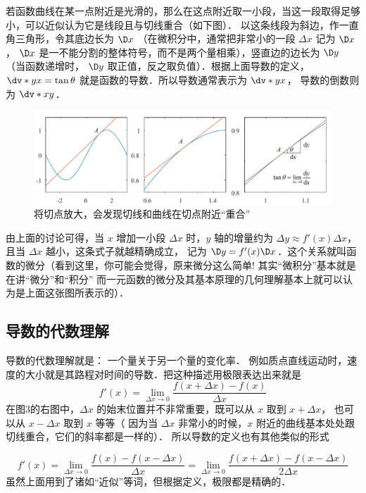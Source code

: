 若函数曲线在某一点附近是光滑的，那么在这点附近取一小段，当这一段取得足够小，可以近似认为它是线段且与切线重合（如下图）． 以这条线段为斜边，作一直角三角形，令其底边长为 $\D x$ （在微积分中，通常把非常小的一段 $\Delta x$ 记为 $\D x$，  $\D x$ 是一不能分割的整体符号，而不是两个量相乘），竖直边的边长为 $\D y$ （当函数递增时， $\D y$ 取正值，反之取负值）．根据上面导数的定义，$\dv*{y}{x} = \tan \theta $ 就是函数的导数．所以导数通常表示为 $\dv*{y}{x}$， 导数的倒数则为 $\dv*{x}{y}$． 

\begin{figure}[ht]
\centering
\includegraphics[width=14cm]{./figures/Der2.pdf}
\caption{将切点放大，会发现切线和曲线在切点附近“重合”}
\end{figure}

由上面的讨论可得，当 $x$ 增加一小段 $\Delta x$ 时，$y$ 轴的增量约为 $\Delta y \approx f'(x)\Delta x$，且当 $\Delta x$ 越小，这条式子就越精确成立， 记为 $\D y = f'(x)\D x$．这个关系就叫函数的微分（看到这里，你可能会觉得，原来微分这么简单! 其实“微积分”基本就是在讲“微分”和“积分” 而一元函数的微分及其基本原理的几何理解基本上就可以认为是上面这张图所表示的）．


\subsection{导数的代数理解}

导数的代数理解就是： 一个量关于另一个量的变化率． 例如质点直线运动时，速度的大小就是其路程对时间的导数．把这种描述用极限表达出来就是
\begin{equation}\label{Der_eq2}
f'(x) = \mathop {\lim }\limits_{\Delta x \to 0} \frac{f(x + \Delta x) - f(x)}{\Delta x}
\end{equation}
在图3的右图中，$\Delta x$ 的始末位置并不非常重要，既可以从 $x$ 取到 $x + \Delta x$， 也可以从 $x - \Delta x$  取到 $x$ 等等（ 因为当 $\Delta x$ 非常小的时候，$x$ 附近的曲线基本处处跟切线重合，它们的斜率都是一样的）． 所以导数的定义也有其他类似的形式

\begin{equation}
f'(x) = \mathop {\lim }\limits_{\Delta x \to 0} \frac{f(x) - f(x - \Delta x)}{\Delta x} = \mathop {\lim }\limits_{\Delta x \to 0} \frac{f(x + \Delta x) - f(x - \Delta x)}{2\Delta x}
\end{equation}
虽然上面用到了诸如“近似”等词，但根据定义，极限都是精确的．



